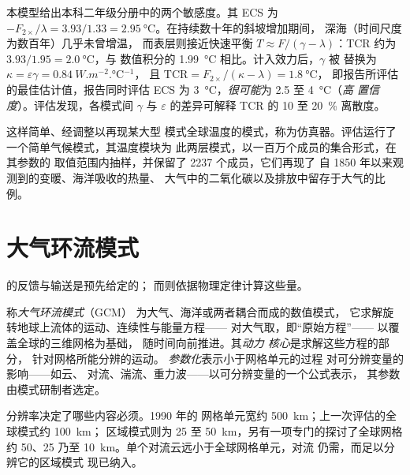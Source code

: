 本模型给出本科二年级分册中的两个敏感度。其 ECS 为
$-F_{2\times}/\lambda = 3.93/1.33 = \qty{2.95}{\celsius}$。在持续数十年的斜坡增加期间，
深海（时间尺度为数百年）几乎未曾增温，
而表层则接近快速平衡 $T \approx F/(\gamma -
\lambda)$：TCR 约为 $3.93/1.95 = \qty{2.0}{\celsius}$，与
数值积分的 \qty{1.99}{\celsius} 相比。计入效力后，$\gamma$ 被
替换为 $\kappa = \varepsilon\gamma = \qty{0.84}{W.m^{-2}.\celsius^{-1}}$，
且 $\text{TCR} = F_{2\times}/(\kappa - \lambda) = \qty{1.8}{\celsius}$，
即报告所评估的最佳估计值，报告同时评估 ECS 为
\qty{3}{\celsius}，\emph{很可能}为 2.5 至 \qty{4}{\celsius}（\emph{高
置信度}）。评估发现，各模式间 $\gamma$ 与
$\varepsilon$ 的差异可解释 TCR 的 10 至 \qty{20}{\percent}
离散度。

这样简单、经调整以再现某大型
模式全球温度的模式，称为仿真器。评估运行了一个简单气候模式，其温度模块为
此两层模式，以一百万个成员的集合形式，在其参数的
取值范围内抽样，并保留了 2237 个成员，它们再现了
自 1850 年以来观测到的变暖、海洋吸收的热量、
大气中的二氧化碳以及排放中留存于大气的比例。

\section{大气环流模式}\label{sec:b3:climate-models:gcm}

的反馈与输送是预先给定的；
而则依据物理定律计算这些量。

\begin{definition}\label{def:b3:climate-models:gcm}
称\emph{大气环流模式}（GCM）
为大气、海洋或两者耦合而成的数值模式，
它求解旋转地球上流体的运动、连续性与能量方程——
对大气取，即“原始方程”——
以覆盖全球的三维网格为基础，
随时间向前推进。其\emph{动力
核心}是求解这些方程的部分，
针对网格所能分辨的运动。
\emph{参数化}表示小于网格单元的过程
对可分辨变量的影响——如云、
对流、湍流、重力波——以可分辨变量的一个公式表示，
其参数由模式研制者选定。
\end{definition}

分辨率决定了哪些内容必须。1990 年的
网格单元宽约 \qty{500}{km}；上一次评估的全球模式约 \qty{100}{km}；
区域模式则为 25 至
\qty{50}{km}，另有一项专门的探讨了全球网格
约 50、25 乃至 \qty{10}{km}。单个对流云远小于全球网格单元，对流
仍需，而足以分辨它的区域模式
现已纳入。

